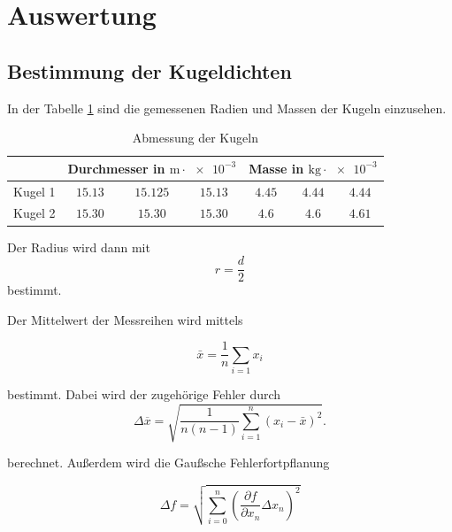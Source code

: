\section{Auswertung}


\subsection{Bestimmung der Kugeldichten}

In der Tabelle \ref{tab:messwerte_kugel} sind die gemessenen
Radien und Massen der Kugeln einzusehen.

\begin{table}
\centering
\begin{tabular} {ccccccc} %
	\toprule
  & \multicolumn{3}{c}{Durchmesser in $\si{\meter}\cdot \num{e-3}$}  & \multicolumn{3}{c}{Masse in $\si{\kilogram}\cdot \num{e-3}$} \\
\midrule 
Kugel 1 & $\num{15.13} $&  $\num{15.125} $ & $\num{15.13} $  & $\num{4.45}$ & $\num{4.44} $ & $\num{4.44} $ \\
Kugel 2  & $\num{15.30} $&  $\num{15.30} $ & $\num{15.30} $ & $\num{4.6}$ & $\num{4.6} $ & $\num{4.61} $ \\
\bottomrule
\end{tabular}
\caption{Abmessung der Kugeln}
\label{tab:messwerte_kugel}
\end{table}

Der Radius wird dann mit
\begin{equation*}
r=\frac{d}{2}
\end{equation*}
bestimmt.

Der Mittelwert der Messreihen wird mittels

\begin{equation}
\label{eq:mittel}
\bar{x}=\frac{1}{n}\sum_{i=1}x_i
\end{equation}

bestimmt. Dabei wird der zugehörige Fehler
durch
\begin{equation}
\label{eq:stand_ab}
\Delta \overline{x}=\sqrt{\frac{1}{n(n-1)}\sum_{i=1}^{n}(x_i-\bar{x})^2}.
\end{equation}

berechnet.
Außerdem wird die Gaußsche Fehlerfortpflanung

\begin{equation}
\label{eq:gauss}
\Delta f=\sqrt{\sum_{i=0}^n\left(\frac{\partial f}{\partial x_n} \Delta x_n\right)^2}
\end{equation}

